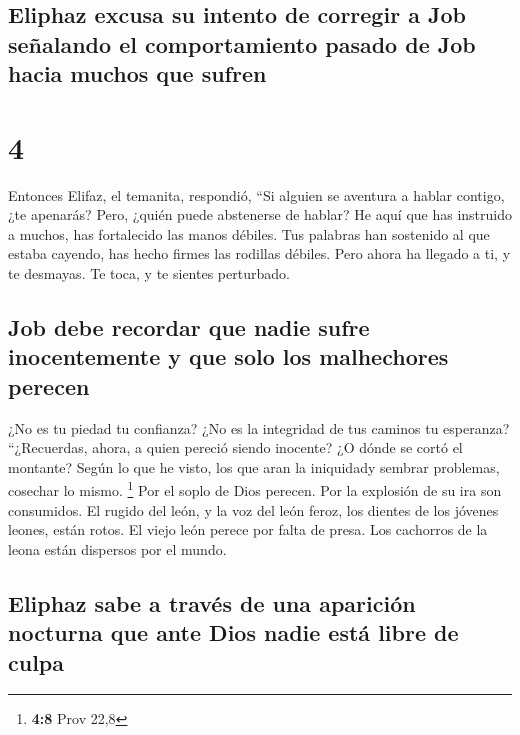\hypertarget{eliphaz-excusa-su-intento-de-corregir-a-job-seuxf1alando-el-comportamiento-pasado-de-job-hacia-muchos-que-sufren}{%
\subsection{Eliphaz excusa su intento de corregir a Job señalando el
comportamiento pasado de Job hacia muchos que
sufren}\label{eliphaz-excusa-su-intento-de-corregir-a-job-seuxf1alando-el-comportamiento-pasado-de-job-hacia-muchos-que-sufren}}

\hypertarget{section-3}{%
\section{4}\label{section-3}}

 Entonces Elifaz, el temanita, respondió, 
``Si alguien se aventura a hablar contigo, ¿te apenarás? Pero, ¿quién
puede abstenerse de hablar?  He aquí que has instruido a
muchos, has fortalecido las manos débiles.  Tus palabras
han sostenido al que estaba cayendo, has hecho firmes las rodillas
débiles.  Pero ahora ha llegado a ti, y te desmayas. Te
toca, y te sientes perturbado.

\hypertarget{job-debe-recordar-que-nadie-sufre-inocentemente-y-que-solo-los-malhechores-perecen}{%
\subsection{Job debe recordar que nadie sufre inocentemente y que solo
los malhechores
perecen}\label{job-debe-recordar-que-nadie-sufre-inocentemente-y-que-solo-los-malhechores-perecen}}

 ¿No es tu piedad tu confianza? ¿No es la integridad de
tus caminos tu esperanza?  ``¿Recuerdas, ahora, a quien
pereció siendo inocente? ¿O dónde se cortó el montante? 
Según lo que he visto, los que aran la iniquidady sembrar problemas,
cosechar lo mismo. \footnote{\textbf{4:8} Prov 22,8}  Por
el soplo de Dios perecen. Por la explosión de su ira son consumidos.
 El rugido del león, y la voz del león feroz, los dientes
de los jóvenes leones, están rotos.  El viejo león perece
por falta de presa. Los cachorros de la leona están dispersos por el
mundo.

\hypertarget{eliphaz-sabe-a-travuxe9s-de-una-apariciuxf3n-nocturna-que-ante-dios-nadie-estuxe1-libre-de-culpa}{%
\subsection{Eliphaz sabe a través de una aparición nocturna que ante
Dios nadie está libre de
culpa}\label{eliphaz-sabe-a-travuxe9s-de-una-apariciuxf3n-nocturna-que-ante-dios-nadie-estuxe1-libre-de-culpa}}

